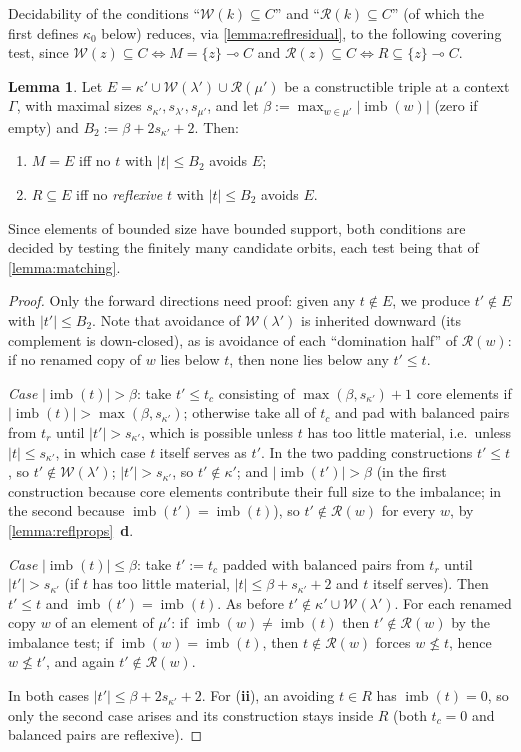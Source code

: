 \documentclass{article}
\theoremstyle{definition}
\newtheorem{lemma}{Lemma}[section]
\newcommand{\cR}{\mathcal{R}}
\newcommand{\cW}{\mathcal{W}}
\newcommand{\imb}{\operatorname{imb}}
\begin{document}
Decidability of the conditions ``$\cW(k)\subseteq C$'' and ``$\cR(k)\subseteq C$'' (of which the first defines $\kappa_0$ below) reduces, via \cref{lemma:reflresidual}, to the following covering test, since $\cW(z)\subseteq C\iff M=\{z\}\multimap C$ and $\cR(z)\subseteq C\iff R\subseteq\{z\}\multimap C$.

\begin{lemma}
    \label{lemma:covertest}
    Let $E=\kappa'\cup\cW(\lambda')\cup\cR(\mu')$ be a constructible triple at a context $\Gamma$, with maximal sizes $s_{\kappa'},s_{\lambda'},s_{\mu'}$, and let $\beta:=\max_{w\in\mu'}|\imb(w)|$ (zero if empty) and $B_2:=\beta+2s_{\kappa'}+2$. Then:
    \begin{enumerate}
        \item[({\bf i})] $M=E$ iff no $t$ with $|t|\leq B_2$ avoids $E$;
        \item[({\bf ii})] $R\subseteq E$ iff no {\it reflexive} $t$ with $|t|\leq B_2$ avoids $E$.
    \end{enumerate}
    Since elements of bounded size have bounded support, both conditions are decided by testing the finitely many candidate orbits, each test being that of \cref{lemma:matching}.
\end{lemma}
\begin{proof}
    Only the forward directions need proof: given any $t\notin E$, we produce $t'\notin E$ with $|t'|\leq B_2$. Note that avoidance of $\cW(\lambda')$ is inherited downward (its complement is down-closed), as is avoidance of each ``domination half'' of $\cR(w)$: if no renamed copy of $w$ lies below $t$, then none lies below any $t'\leq t$.

    {\it Case} $|\imb(t)|>\beta$: take $t'\leq t_c$ consisting of $\max(\beta,s_{\kappa'})+1$ core elements if $|\imb(t)|>\max(\beta,s_{\kappa'})$; otherwise take all of $t_c$ and pad with balanced pairs from $t_r$ until $|t'|>s_{\kappa'}$, which is possible unless $t$ has too little material, i.e.\ unless $|t|\leq s_{\kappa'}$, in which case $t$ itself serves as $t'$. In the two padding constructions $t'\leq t$, so $t'\notin\cW(\lambda')$; $|t'|>s_{\kappa'}$, so $t'\notin\kappa'$; and $|\imb(t')|>\beta$ (in the first construction because core elements contribute their full size to the imbalance; in the second because $\imb(t')=\imb(t)$), so $t'\notin\cR(w)$ for every $w$, by \cref{lemma:reflprops}~{\bf d}.

    {\it Case} $|\imb(t)|\leq\beta$: take $t':=t_c$ padded with balanced pairs from $t_r$ until $|t'|>s_{\kappa'}$ (if $t$ has too little material, $|t|\leq\beta+s_{\kappa'}+2$ and $t$ itself serves). Then $t'\leq t$ and $\imb(t')=\imb(t)$. As before $t'\notin\kappa'\cup\cW(\lambda')$. For each renamed copy $w$ of an element of $\mu'$: if $\imb(w)\neq\imb(t)$ then $t'\notin\cR(w)$ by the imbalance test; if $\imb(w)=\imb(t)$, then $t\notin\cR(w)$ forces $w\not\leq t$, hence $w\not\leq t'$, and again $t'\notin\cR(w)$.

    In both cases $|t'|\leq\beta+2s_{\kappa'}+2$. For ({\bf ii}), an avoiding $t\in R$ has $\imb(t)=0$, so only the second case arises and its construction stays inside $R$ (both $t_c=0$ and balanced pairs are reflexive).
\end{proof}
\end{document}
